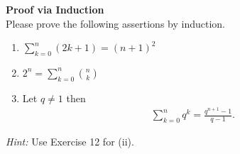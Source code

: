 \textbf{Proof via Induction}\\
Please prove the following assertions by induction.
\begin{enumerate}
	\item $\sum_{k=0}^{n} (2k+1) = (n+1)^2$
	\item $2^n = \sum_{k=0}^n \binom{n}{k}$
	\item Let $q \neq 1$ then
	\begin{align*}
	\sum_{k=0}^{n} q^k = \frac{q^{n+1} - 1}{q -1}.
	\end{align*}
\end{enumerate}
\textit{Hint:} Use Exercise 12 for (ii).